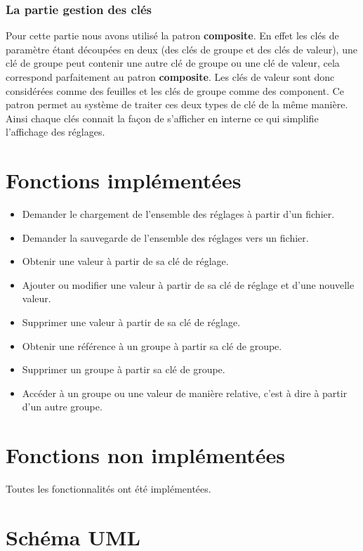 \documentclass[12pt]{article}
\begin{document}
	\subsubsection{La partie gestion des clés}
	
		Pour cette partie nous avons utilisé la patron \textbf{composite}. En effet les clés de paramètre étant découpées en deux (des clés de groupe et des clés de valeur), une clé de groupe peut contenir une autre clé de groupe ou une clé de valeur, cela correspond parfaitement au patron \textbf{composite}. Les clés de valeur sont donc considérées comme des feuilles et les clés de groupe comme des component. Ce patron permet au système de traiter ces deux types de clé de la même manière. Ainsi chaque clés connait la façon de s'afficher en interne ce qui simplifie l'affichage des réglages.
\section{Fonctions implémentées}
\label{sec:fonctions_impl}

\begin{itemize}
	\item Demander le chargement de l’ensemble des réglages à partir d’un fichier.
	\item Demander la sauvegarde de l’ensemble des réglages vers un fichier.
	\item Obtenir une valeur à partir de sa clé de réglage.
	\item Ajouter ou modifier une valeur à partir de sa clé de réglage et d’une nouvelle valeur.
	\item Supprimer une valeur à partir de sa clé de réglage.
	\item Obtenir une référence à un groupe à partir sa clé de groupe.
	\item Supprimer un groupe à partir sa clé de groupe.
	\item Accéder à un groupe ou une valeur de manière relative, c'est à dire à partir d’un autre groupe.
\end{itemize}

\section{Fonctions non implémentées}
\label{sec:fonctions_non_impl}
Toutes les fonctionnalités ont été implémentées.

\section{Schéma UML}

\end{document}
